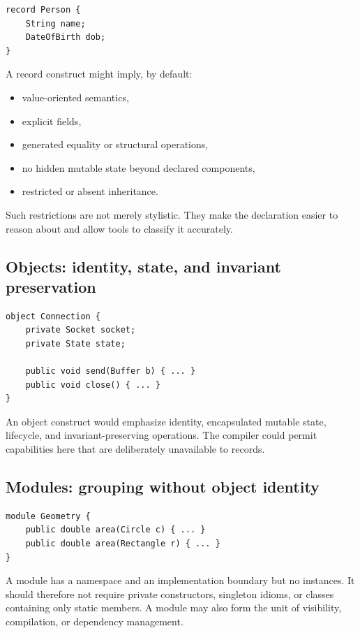 \documentclass[11pt]{article}
\begin{document}
\begin{lstlisting}
record Person {
    String name;
    DateOfBirth dob;
}
\end{lstlisting}

A record construct might imply, by default:

\begin{itemize}[nosep]
    \item value-oriented semantics,
    \item explicit fields,
    \item generated equality or structural operations,
    \item no hidden mutable state beyond declared components,
    \item restricted or absent inheritance.
\end{itemize}

Such restrictions are not merely stylistic. They make the declaration easier to reason about and allow tools to classify it accurately.

\subsection{Objects: identity, state, and invariant preservation}

\begin{lstlisting}
object Connection {
    private Socket socket;
    private State state;

    public void send(Buffer b) { ... }
    public void close() { ... }
}
\end{lstlisting}

An object construct would emphasize identity, encapsulated mutable state, lifecycle, and invariant-preserving operations. The compiler could permit capabilities here that are deliberately unavailable to records.

\subsection{Modules: grouping without object identity}

\begin{lstlisting}
module Geometry {
    public double area(Circle c) { ... }
    public double area(Rectangle r) { ... }
}
\end{lstlisting}

A module has a namespace and an implementation boundary but no instances. It should therefore not require private constructors, singleton idioms, or classes containing only static members. A module may also form the unit of visibility, compilation, or dependency management.
\end{document}
